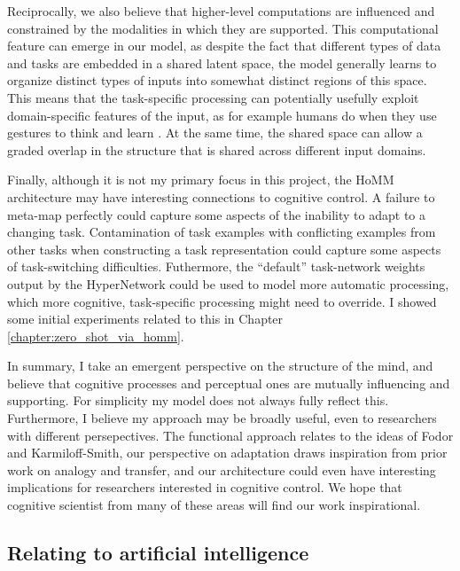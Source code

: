 Reciprocally, we also believe that higher-level computations are influenced and constrained by the modalities in which they are supported. This computational feature can emerge in our model, as despite the fact that different types of data and tasks are embedded in a shared latent space, the model generally learns to organize distinct types of inputs into somewhat distinct regions of this space. This means that the task-specific processing can potentially usefully exploit domain-specific features of the input, as for example humans do when they use gestures to think and learn \citep{Goldin-Meadow1999, Wakefield2018}. At the same time, the shared space can allow a graded overlap in the structure that is shared across different input domains. \par

Finally, although it is not my primary focus in this project, the HoMM architecture may have interesting connections to cognitive control. A failure to meta-map perfectly could capture some aspects of the inability to adapt to a changing task. Contamination of task examples with conflicting examples from other tasks when constructing a task representation could capture some aspects of task-switching difficulties. Futhermore, the ``default'' task-network weights output by the HyperNetwork could be used to model more automatic processing, which more cognitive, task-specific processing might need to override. I showed some initial experiments related to this in Chapter \ref{chapter:zero_shot_via_homm}. \par

In summary, I take an emergent perspective on the structure of the mind, and believe that cognitive processes and perceptual ones are mutually influencing and supporting. For simplicity my model does not always fully reflect this. Furthermore, I believe my approach may be broadly useful, even to researchers with different persepectives. The functional approach relates to the ideas of Fodor and Karmiloff-Smith, our perspective on adaptation draws inspiration from prior work on analogy and transfer, and our architecture could even have interesting implications for researchers interested in cognitive control. We hope that cognitive scientist from many of these areas will find our work inspirational.

\subsection{Relating to artificial intelligence}

